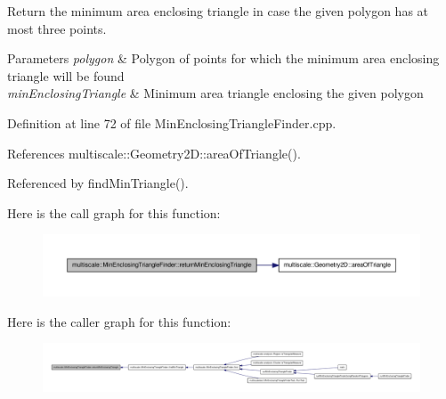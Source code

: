 \-Return the minimum area enclosing triangle in case the given polygon has at most three points. 


\begin{DoxyParams}{\-Parameters}
{\em polygon} & \-Polygon of points for which the minimum area enclosing triangle will be found \\
\hline
{\em min\-Enclosing\-Triangle} & \-Minimum area triangle enclosing the given polygon \\
\hline
\end{DoxyParams}


\-Definition at line 72 of file \-Min\-Enclosing\-Triangle\-Finder.\-cpp.



\-References multiscale\-::\-Geometry2\-D\-::area\-Of\-Triangle().



\-Referenced by find\-Min\-Triangle().



\-Here is the call graph for this function\-:\nopagebreak
\begin{figure}[H]
\begin{center}
\leavevmode
\includegraphics[width=350pt]{classmultiscale_1_1MinEnclosingTriangleFinder_af6e49a1ef5a0d4dbe3e25c2f92d69dc3_cgraph}
\end{center}
\end{figure}




\-Here is the caller graph for this function\-:\nopagebreak
\begin{figure}[H]
\begin{center}
\leavevmode
\includegraphics[width=350pt]{classmultiscale_1_1MinEnclosingTriangleFinder_af6e49a1ef5a0d4dbe3e25c2f92d69dc3_icgraph}
\end{center}
\end{figure}


